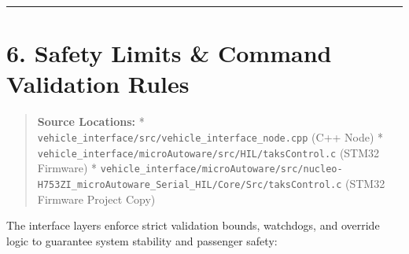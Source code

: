 \documentclass[12pt,a4paper,oneside]{report}
\begin{document}
\begin{center}\rule{0.5\linewidth}{0.5pt}\end{center}

\section{6. Safety Limits \& Command Validation
Rules}\label{safety-limits-command-validation-rules}

\begin{quote}
\textbf{Source Locations:} *
\texttt{vehicle\_interface/src/vehicle\_interface\_node.cpp} (C++ Node) *
\texttt{vehicle\_interface/microAutoware/src/HIL/taksControl.c} (STM32 Firmware)
*
\texttt{vehicle\_interface/microAutoware/src/nucleo-H753ZI\_microAutoware\_Serial\_HIL/Core/Src/taksControl.c}
(STM32 Firmware Project Copy)
\end{quote}

The interface layers enforce strict validation bounds, watchdogs, and override
logic to guarantee system stability and passenger safety:
\end{document}

